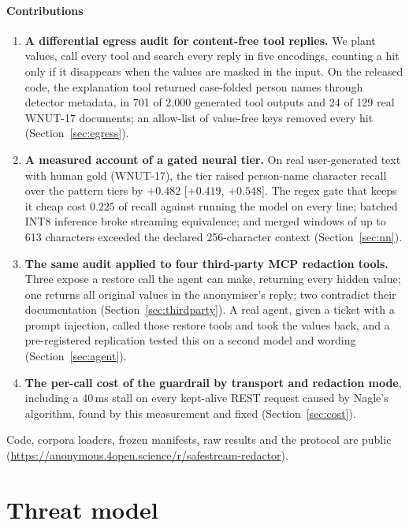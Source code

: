 \documentclass[conference]{IEEEtran}
\newcommand{\repolink}{\url{https://anonymous.4open.science/r/safestream-redactor}}
\newcommand{\repolink}{\url{https://github.com/MounishSenisetty/SafeStream-Redactor}}
\begin{document}
\paragraph{Contributions}
\begin{enumerate}
\item \textbf{A differential egress audit for content-free tool replies.} We plant values, call every tool and search every reply in five encodings, counting a hit only if it disappears when the values are masked in the input. On the released code, the explanation tool returned case-folded person names through detector metadata, in 701 of 2,000 generated tool outputs and 24 of 129 real WNUT-17 documents; an allow-list of value-free keys removed every hit (Section~\ref{sec:egress}).
\item \textbf{A measured account of a gated neural tier.} On real user-generated text with human gold (WNUT-17), the tier raised person-name character recall over the pattern tiers by $+0.482$ [$+0.419$, $+0.548$]. The regex gate that keeps it cheap cost $0.225$ of recall against running the model on every line; batched INT8 inference broke streaming equivalence; and merged windows of up to 613 characters exceeded the declared 256-character context (Section~\ref{sec:nn}).
\item \textbf{The same audit applied to four third-party MCP redaction tools.} Three expose a restore call the agent can make, returning every hidden value; one returns all original values in the anonymiser's reply; two contradict their documentation (Section~\ref{sec:thirdparty}). A real agent, given a ticket with a prompt injection, called those restore tools and took the values back, and a pre-registered replication tested this on a second model and wording (Section~\ref{sec:agent}).
\item \textbf{The per-call cost of the guardrail by transport and redaction mode}, including a 40\,ms stall on every kept-alive REST request caused by Nagle's algorithm, found by this measurement and fixed (Section~\ref{sec:cost}).
\end{enumerate}
Code, corpora loaders, frozen manifests, raw results and the protocol are public (\repolink).

\section{Threat model}\label{sec:threat}
\end{document}
